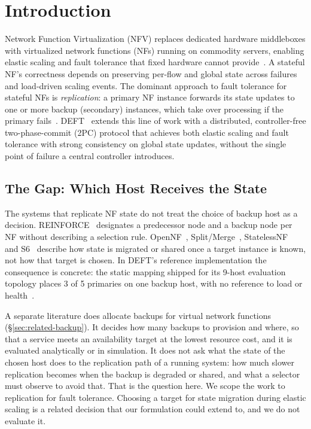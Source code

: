 \documentclass[journal]{IEEEtran}
\begin{document}
\section{Introduction}
\label{sec:intro}

Network Function Virtualization (NFV) replaces dedicated hardware middleboxes with
virtualized network functions (NFs) running on commodity servers, enabling elastic
scaling and fault tolerance that fixed hardware cannot provide~\cite{han2015network}.
A stateful NF's correctness depends on preserving per-flow and global state across
failures and load-driven scaling events. The dominant approach to fault tolerance for
stateful NFs is \emph{replication}: a primary NF instance forwards its state updates to
one or more backup (secondary) instances, which take over processing if the primary
fails~\cite{rajagopalan2013pico,sherry2015rollback,kulkarni2018reinforce}. DEFT~\cite{shahriyar2023deft}
extends this line of work with a distributed, controller-free two-phase-commit (2PC)
protocol that achieves both elastic scaling and fault tolerance with strong consistency
on global state updates, without the single point of failure a central controller
introduces.

\subsection{The Gap: Which Host Receives the State}

The systems that replicate NF state do not treat the choice of backup host as a
decision. REINFORCE~\cite{kulkarni2018reinforce} designates a predecessor node
and a backup node per NF without describing a selection rule.
OpenNF~\cite{gember2014opennf}, Split/Merge~\cite{rajagopalan2013split},
StatelessNF~\cite{kablan2017stateless} and S6~\cite{woo2018elastic} describe how
state is migrated or shared once a target instance is known, not how that target
is chosen. In DEFT's reference implementation the consequence is concrete: the
static mapping shipped for its 9-host evaluation topology places 3 of 5
primaries on one backup host, with no reference to load or
health~\cite{shahriyar2023deft}.

A separate literature does allocate backups for virtual network functions
(\S\ref{sec:related-backup}). It decides how many backups to provision and where,
so that a service meets an availability target at the lowest resource cost, and
it is evaluated analytically or in simulation. It does not ask what the state of
the chosen host does to the replication path of a running system: how much
slower replication becomes when the backup is degraded or shared, and what a
selector must observe to avoid that. That is the question here. We scope the
work to replication for fault tolerance. Choosing a target for state migration
during elastic scaling is a related decision that our formulation could extend
to, and we do not evaluate it.
\end{document}
